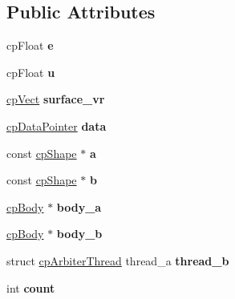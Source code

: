 \subsection*{Public Attributes}
\begin{DoxyCompactItemize}
\item 
\mbox{\label{structcpArbiter_ae28e688fb03eba42a1dd786ab914c9eb}} 
cp\+Float {\bfseries e}
\item 
\mbox{\label{structcpArbiter_a1be4918be41986330005a6e745d013f3}} 
cp\+Float {\bfseries u}
\item 
\mbox{\label{structcpArbiter_ad8724ab2c97ec732128fafc77668cc54}} 
\hyperlink{structcpVect}{cp\+Vect} {\bfseries surface\+\_\+vr}
\item 
\mbox{\label{structcpArbiter_afb41ae8c3e4df711f47ab7ac3ef7ed9a}} 
\hyperlink{group__basicTypes_ga2ac2c3c31e21893941f9e4f8ee279447}{cp\+Data\+Pointer} {\bfseries data}
\item 
\mbox{\label{structcpArbiter_a39516006afef12871db8f0d625441cff}} 
const \hyperlink{structcpShape}{cp\+Shape} $\ast$ {\bfseries a}
\item 
\mbox{\label{structcpArbiter_a0609639e649ef29acf5f5aaeb26d2036}} 
const \hyperlink{structcpShape}{cp\+Shape} $\ast$ {\bfseries b}
\item 
\mbox{\label{structcpArbiter_affd6d342f71c2a92a638a4d4ae417bb7}} 
\hyperlink{structcpBody}{cp\+Body} $\ast$ {\bfseries body\+\_\+a}
\item 
\mbox{\label{structcpArbiter_a07ad23b13b383a3fd3e4834865ad4b50}} 
\hyperlink{structcpBody}{cp\+Body} $\ast$ {\bfseries body\+\_\+b}
\item 
\mbox{\label{structcpArbiter_a33883f0931febf9b4111c0f795834b4f}} 
struct \hyperlink{structcpArbiterThread}{cp\+Arbiter\+Thread} thread\+\_\+a {\bfseries thread\+\_\+b}
\item 
\mbox{\label{structcpArbiter_a7dfee6fde35d7bb551ee24fcbbe49018}} 
int {\bfseries count}

\end{DoxyCompactItemize}
